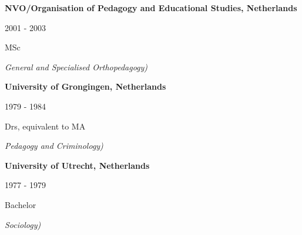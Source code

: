 \documentclass[
  16,
]{article}
\begin{document}
\begin{large}
  \begin{multicols}{2}
    \begin{flushleft}{\bf NVO/Organisation of Pedagogy and Educational Studies, Netherlands}\end{flushleft}
    \begin{flushright}2001 - 2003\end{flushright}
  \end{multicols}
  \vspace{-0.17cm}
  \begin{multicols}{2}
    \begin{flushleft}MSc\end{flushleft}
  \end{multicols}
  \vspace{-0.25cm}
  \textit{General and Specialised Orthopedagogy)}
\end{large}
\vspace{3pt}

\begin{large}
  \begin{multicols}{2}
    \begin{flushleft}{\bf University of Grongingen, Netherlands}\end{flushleft}
    \begin{flushright}1979 - 1984\end{flushright}
  \end{multicols}
  \vspace{-0.17cm}
  \begin{multicols}{2}
    \begin{flushleft}Drs, equivalent to MA\end{flushleft}
  \end{multicols}
  \vspace{-0.25cm}
  \textit{Pedagogy and Criminology)}
\end{large}
\vspace{3pt}

\begin{large}
  \begin{multicols}{2}
    \begin{flushleft}{\bf University of Utrecht, Netherlands}\end{flushleft}
    \begin{flushright}1977 - 1979\end{flushright}
  \end{multicols}
  \vspace{-0.17cm}
  \begin{multicols}{2}
    \begin{flushleft}Bachelor\end{flushleft}
  \end{multicols}
  \vspace{-0.25cm}
  \textit{Sociology)}
\end{large}
\vspace{3pt}
\end{document}

